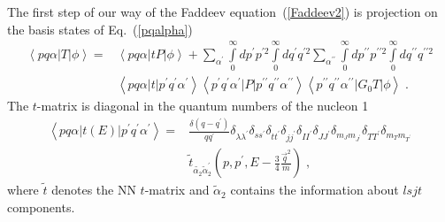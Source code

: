 
The first step of our way of the Faddeev equation~(\ref{Faddeev2}) is projection on the basis states of Eq.~(\ref{pqalpha})~\cite{Glockle1996, glockle1983quantum}
\begin{equation}
\begin{split}
\left<pq\alpha|T|\phi\right>  = &\left<pq\alpha|tP|\phi\right> + \sum\limits_{\alpha^{\prime}}\int\limits_{0}^{\infty}dp^{\prime}p^{\prime 2}\int\limits_{0}^{\infty}dq^{\prime}q^{\prime 2}\sum\limits_{\alpha^{\prime\prime}}\int\limits_{0}^{\infty}dp^{\prime\prime}p^{\prime\prime 2}\int\limits_{0}^{\infty}dq^{\prime\prime}q^{\prime\prime 2}\\
&\left<pq\alpha|t|p^{\prime} q^{\prime}\alpha^{\prime}\right>\left<p^{\prime}q^{\prime}\alpha^{\prime}|P|p^{\prime \prime} q^{\prime \prime}\alpha^{\prime \prime}\right>\left<p^{\prime\prime}q^{\prime\prime}\alpha^{\prime\prime}|G_{0}T|\phi\right>\;.
\end{split}
\label{firststep}
\end{equation}
The $t$-matrix is diagonal in the quantum numbers of the nucleon 1 
\begin{equation}
\begin{split}
\left<pq\alpha|t(E)|p^{\prime} q^{\prime}\alpha^{\prime}\right> = &\frac{\delta (q - q^{\prime})}{qq^{\prime}}\delta_{\lambda\lambda^{\prime}}\delta_{ss^{\prime}}\delta_{tt^{\prime}}\delta_{jj^{\prime}}\delta_{II^{\prime}}\delta_{JJ^{\prime}}\delta_{m_{J}m_{J^{\prime}}}\delta_{TT^{\prime}}\delta_{m_{T}m_{T^{\prime}}} \\ &\tilde{t}_{\tilde{\alpha_{2}}\tilde{\alpha}^{\prime}_{2}}\left(p,p^{\prime}, E-\frac{3}{4}\frac{\!\vec{\,q}^{2}}{m}\right)\;,
\end{split}
\label{pqat2}
\end{equation}
where $\tilde{t}$ denotes the NN $t$-matrix and $\tilde{\alpha}_{2}$ contains the information about $lsjt$ components.

